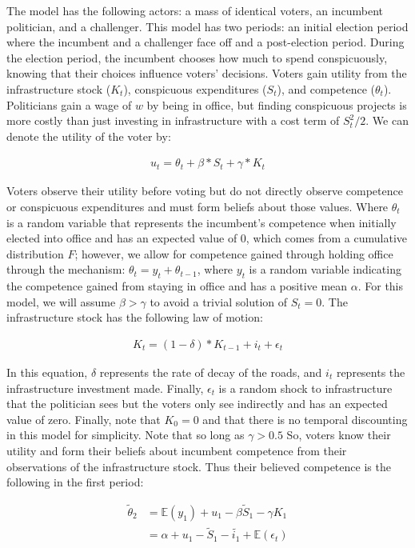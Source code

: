 The model has the following actors: a mass of identical voters, an incumbent politician, and a challenger. 
This model has two periods: an initial election period where the incumbent and a challenger face off and a post-election period. 
During the election period, the incumbent chooses how much to spend conspicuously, knowing that their choices influence voters' decisions. 
Voters gain utility from the infrastructure stock ($K_t$), conspicuous expenditures ($S_t$), and competence ($\theta_t$). 
Politicians gain a wage of $w$ by being in office, but finding conspicuous projects is more costly than just investing in infrastructure with a cost term of $S_t^2/2$. 
We can denote the utility of the voter by:

\begin{align}
    u_t=\theta_t+\beta*S_t+\gamma*K_t
\end{align}

Voters observe their utility before voting but do not directly observe competence or conspicuous expenditures and must form beliefs about those values. 
Where $\theta_t$ is a random variable that represents the incumbent's competence when initially elected into office and has an expected value of 0, which comes from a cumulative distribution $F$; however, we allow for competence gained through holding office through the mechanism: $\theta_t=y_t+\theta_{t-1}$, where $y_t$ is a random variable indicating the competence gained from staying in office and has a positive mean $\alpha$. 
For this model, we will assume $\beta>\gamma$ to avoid a trivial solution of $S_t=0$. 
The infrastructure stock has the following law of motion:

\begin{align}
    K_t=(1-\delta)*K_{t-1}+i_t+\epsilon_t
\end{align}

In this equation, $\delta$ represents the rate of decay of the roads, and $i_t$ represents the infrastructure investment made. 
Finally, $\epsilon_t$ is a random shock to infrastructure that the politician sees but the voters only see indirectly and has an expected value of zero. 
Finally, note that $K_0=0$ and that there is no temporal discounting in this model for simplicity. 
Note that so long as $\gamma>0.5$ So, voters know their utility and form their beliefs about incumbent competence from their observations of the infrastructure stock. 
Thus their believed competence is the following in the first period:

\begin{align*}
    \tilde{\theta}_2&=\mathbb{E}(y_1)+u_1-\beta \tilde{S}_1-\gamma K_1 \\
    &=\alpha+u_1-\tilde{S}_1-\tilde{i_1}+\mathbb{E}(\epsilon_t)
\end{align*}

